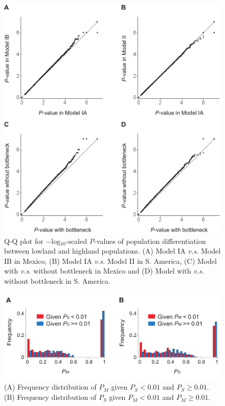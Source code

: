\begin{figure}[t]
  \begin{center}
    \includegraphics[width=0.6\columnwidth]{fig/bot2.pdf}
    \caption{Q-Q plot for $-$log$_{10}$-scaled \emph{P}-values of population differentiation between lowland and highland populations. (A) Model IA \emph{v.s.} Model IB in Mexico, (B) Model IA \emph{v.s.} Model II in S. America, (C) Model with \emph{v.s.} without bottleneck in Mexico and (D) Model with \emph{v.s.} without bottleneck in S. America.}
    \label{fig:qq}
  \end{center}
\end{figure}


\begin{figure}[t]
  \begin{center}
    \includegraphics[width=0.8\columnwidth]{fig/pmps.pdf}
    \caption{(A) Frequency distribution of $P_M$ given $P_S<0.01$ and $P_S\geq0.01$.  (B) Frequency distribution of $P_S$ given $P_M<0.01$ and $P_M\geq0.01$.}
    \label{pval_freq_comparison}
  \end{center}
\end{figure}

